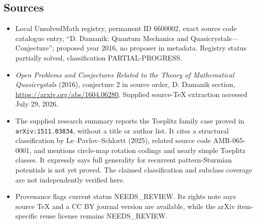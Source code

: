 \documentclass[11pt]{article}
\begin{document}
\subsection{Sources}
\begin{itemize}
\item Local UnsolvedMath registry, permanent ID 6600002, exact source code catalogue entry, ``D. Damanik: Quantum Mechanics and Quasicrystals---Conjecture''; proposed year 2016, no proposer in metadata. Registry status partially solved, classification PARTIAL-PROGRESS.
\item \emph{Open Problems and Conjectures Related to the Theory of Mathematical Quasicrystals} (2016), conjecture 2 in source order, D. Damanik section, \url{https://arxiv.org/abs/1604.06280}. Supplied source-TeX extraction accessed July 29, 2026.
\item The supplied research summary reports the Toeplitz family case proved in \texttt{arXiv:1511.03834}, without a title or author list. It cites a structural classification by Le--Pavlov--Schlortt (2025), related source code AMR-065-0001, and mentions circle-map rotation codings and nearly simple Toeplitz classes. It expressly says full generality for recurrent pattern-Sturmian potentials is not yet proved. The claimed classification and subclass coverage are not independently verified here.
\item Provenance flags current status NEEDS\_REVIEW. Its rights note says source TeX and a CC BY journal version are available, while the arXiv item-specific reuse license remains NEEDS\_REVIEW.
\end{itemize}
\end{document}
